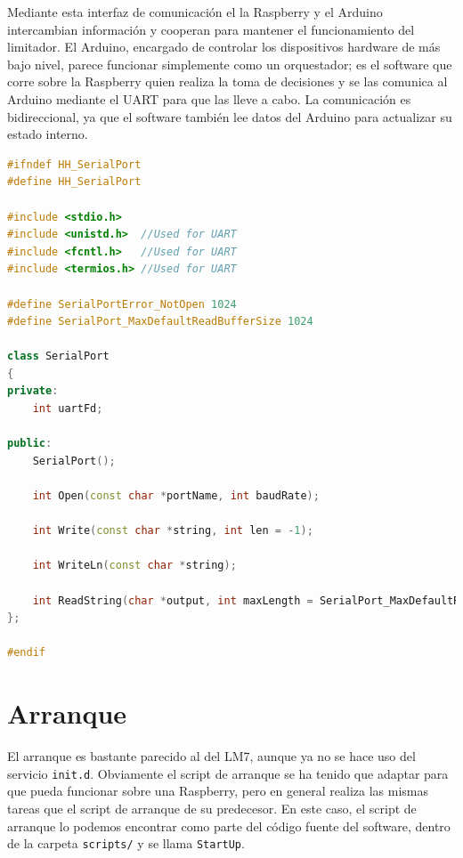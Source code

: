 Mediante esta interfaz de comunicación el la Raspberry y el Arduino intercambian información y cooperan para mantener el funcionamiento del limitador. El Arduino, encargado de controlar los dispositivos hardware de más bajo nivel, parece funcionar simplemente como un orquestador; es el software que corre sobre la Raspberry quien realiza la toma de decisiones y se las comunica al Arduino mediante el \acrshort{UART} para que las lleve a cabo. La comunicación es bidireccional, ya que el software también lee datos del Arduino para actualizar su estado interno. \\

\begin{lstlisting}[language=c++, caption={Clase SerialPort}, label={lst:lms9-serialport}]
#ifndef HH_SerialPort
#define HH_SerialPort

#include <stdio.h>
#include <unistd.h>	 //Used for UART
#include <fcntl.h>	 //Used for UART
#include <termios.h> //Used for UART

#define SerialPortError_NotOpen 1024
#define SerialPort_MaxDefaultReadBufferSize 1024

class SerialPort
{
private:
	int uartFd;

public:
	SerialPort();

	int Open(const char *portName, int baudRate);

	int Write(const char *string, int len = -1);

	int WriteLn(const char *string);

	int ReadString(char *output, int maxLength = SerialPort_MaxDefaultReadBufferSize);
};

#endif
\end{lstlisting}

\section{Arranque}

El arranque es bastante parecido al del \acrshort{LM7}, aunque ya no se hace uso del servicio \verb|init.d|. Obviamente el script de arranque se ha tenido que adaptar para que pueda funcionar sobre una Raspberry, pero en general realiza las mismas tareas que el script de arranque de su predecesor. En este caso, el script de arranque lo podemos encontrar como parte del código fuente del software, dentro de la carpeta \verb|scripts/| y se llama \verb|StartUp|.

